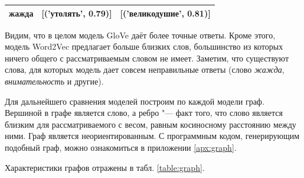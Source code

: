 \documentclass[coursework]{SCWorks}
\begin{document}
\begin{table}[!h]
\begin{tabular}{|l|l|l|}
        жажда                               & {[}('утолять', 0.79){]}             & {[}('великодушие', 0.81){]}                                                                                                                                                                                                                                                           \\ \hline
    \end{tabular}
    \label{table:cherrypick}
\end{table}

Видим, что в целом модель GloVe даёт более точные ответы. Кроме этого, модель Word2Vec предлагает больше близких слов, большинство из которых ничего общего с рассматриваемым словом не имеет. Заметим, что существуют слова, для которых модель дает совсем неправильные ответы (слово \textit{жажда}, \textit{внимательность} и другие). 
 
Для дальнейшего сравнения моделей построим по каждой модели граф. Вершиной в графе является слово, а ребро "--- факт того, что слово является близким для рассматриваемого с весом, равным косиносному расстоянию между ними. Граф является неориентированным. С программным кодом, генерирующим подобный граф, можно ознакомиться в приложении \ref{apx:graph}.

Характеристики графов отражены в табл. \ref{table:graph}.
\end{document}
